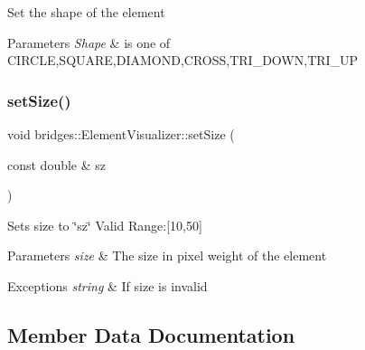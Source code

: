 Set the shape of the element


\begin{DoxyParams}{Parameters}
{\em Shape} & is one of C\+I\+R\+C\+LE,S\+Q\+U\+A\+RE,D\+I\+A\+M\+O\+ND,C\+R\+O\+SS,T\+R\+I\+\_\+\+D\+O\+WN,T\+R\+I\+\_\+\+UP \\
\hline
\end{DoxyParams}
\mbox{\label{classbridges_1_1_element_visualizer_a6fc924e754008992b310a89d8d88fce9}} 
\subsubsection{\texorpdfstring{set\+Size()}{setSize()}}
{\footnotesize\ttfamily void bridges\+::\+Element\+Visualizer\+::set\+Size (\begin{DoxyParamCaption}\item[{const double \&}]{sz }\end{DoxyParamCaption})\hspace{0.3cm}{\ttfamily [inline]}}

Sets size to \char`\"{}sz\char`\"{} Valid Range\+:\mbox{[}10,50\mbox{]}


\begin{DoxyParams}{Parameters}
{\em size} & The size in pixel weight of the element \\
\hline
\end{DoxyParams}

\begin{DoxyExceptions}{Exceptions}
{\em string} & If size is invalid \\
\hline
\end{DoxyExceptions}


\subsection{Member Data Documentation}
\mbox{\label{classbridges_1_1_element_visualizer_ade224640b18e3f6eed42098ea0ad5b3a}} 
